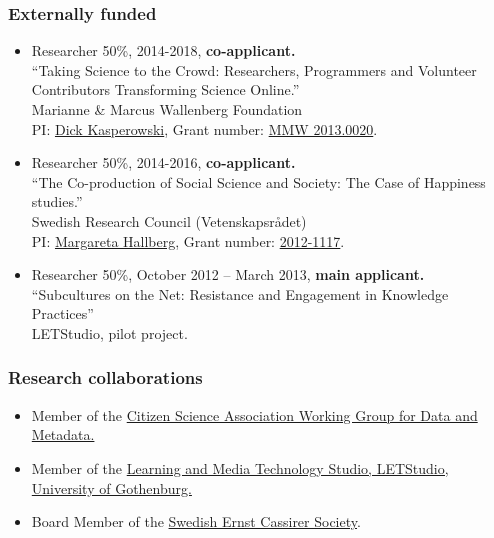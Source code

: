 \documentclass[a4paper,11pt,oneside]{article}
\begin{document}
{    \subsubsection{Externally funded}
    \begin{itemize}
      \item Researcher 50\%, 2014-2018, \textbf{co-applicant.} \\
      ``Taking Science to the Crowd: Researchers, Programmers and Volunteer  \\
      Contributors Transforming Science Online.''\\ Marianne \& Marcus Wallenberg Foundation\\
      PI: \href{mailto:dick.kasperowski@gu.se}{Dick Kasperowski}, Grant number: \href{https://www.wallenberg.com/MMW/projektanslag-2013}{MMW 2013.0020}.
      \item Researcher 50\%, 2014-2016, \textbf{co-applicant.} \\
      ``The Co-production of Social Science and Society: The Case of Happiness studies.''  \\
      Swedish Research Council (Vetenskapsrådet)\\
      PI: \href{mailto:margareta.hallberg@gu.se}{Margareta Hallberg}, Grant number: \href{http://vrproj.vr.se/detail.asp?arendeid=90421}{2012-1117}.
      \item Researcher 50\%, October 2012 – March 2013, \textbf{main applicant.}\\
      ``Subcultures on the Net: Resistance and Engagement in Knowledge Practices''\\
      LETStudio, pilot project.
    \end{itemize}

    \subsubsection{Research collaborations}
    \begin{itemize}
      \item Member of the \href{https://citizenscienceassociation.org/overview/steering-committees/#metadata}{Citizen Science Association Working Group for Data and Metadata.}
      \item Member of the \href{http://letstudio.gu.se/members/christopher-kullenberg}{Learning and Media Technology Studio, LETStudio, University of Gothenburg.}
      \item Board Member of the \href{http://cassirer.se/sallskapet/styrelse/}{Swedish Ernst Cassirer Society}.
    \end{itemize}



}
\end{document}
